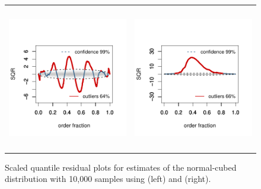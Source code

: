 \begin{figure}[!htb]
\centering
\begin{tabular}{p{} p{}}
  \vspace{0pt} \includegraphics[width=2.2in, height=2.5in]{Figure5a.pdf} &
  \vspace{0pt} \includegraphics[width=2.2in, height=2.5in]{Figure5b.pdf} 
\end{tabular}
\caption{\label{fig:normalcubed1} Scaled quantile residual plots for estimates of the normal-cubed distribution with 10,000 samples using  (left) and  (right).}
\end{figure}

